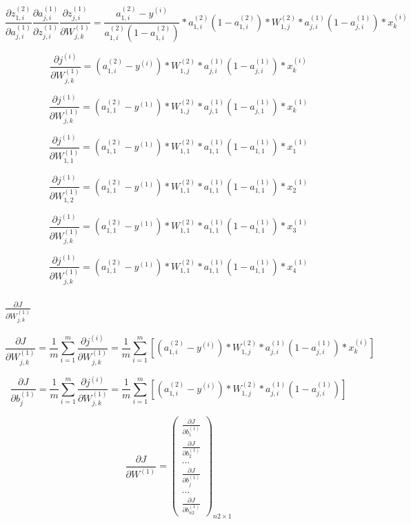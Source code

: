 \documentclass[
]{article}
\begin{document}
\[\frac{\partial{z^{(2)}_{1,i}}}{\partial{a^{(1)}_{j,i}}} \frac{\partial{a^{(1)}_{j,i}}}{\partial{z^{(1)}_{j,i}}} \frac{\partial{z^{(1)}_{j,i}}}{\partial{W^{(1)}_{j,k}}} = \frac{a^{(2)}_{1,i}-y^{(i)}}{a^{(2)}_{1,i}(1-a^{(2)}_{1,i})} * {a^{(2)}_{1,i}(1-a^{(2)}_{1,i})} * W^{(2)}_{1,j} * {a^{(1)}_{j,i}}(1-{a^{(1)}_{j,i}}) * x^{(i)}_{k}\]

\[\frac{\partial{j^{(i)}}}{\partial{W^{(1)}_{j,k}}} = (a^{(2)}_{1,i}-y^{(i)}) * W^{(2)}_{1,j} * {a^{(1)}_{j,i}}(1-{a^{(1)}_{j,i}}) * x^{(i)}_{k}\]

\[\frac{\partial{j^{(1)}}}{\partial{W^{(1)}_{j,k}}} = (a^{(2)}_{1,1}-y^{(1)}) * W^{(2)}_{1,j} * {a^{(1)}_{j,1}}(1-{a^{(1)}_{j,1}}) * x^{(1)}_{k}\]

\[\frac{\partial{j^{(1)}}}{\partial{W^{(1)}_{1,1}}} = (a^{(2)}_{1,1}-y^{(1)}) * W^{(2)}_{1,1} * {a^{(1)}_{1,1}}(1-{a^{(1)}_{1,1}}) * x^{(1)}_{1}\]

\[\frac{\partial{j^{(1)}}}{\partial{W^{(1)}_{1,2}}} = (a^{(2)}_{1,1}-y^{(1)}) * W^{(2)}_{1,1} * {a^{(1)}_{1,1}}(1-{a^{(1)}_{1,1}}) * x^{(1)}_{2}\]

\[\frac{\partial{j^{(1)}}}{\partial{W^{(1)}_{j,k}}} = (a^{(2)}_{1,1}-y^{(1)}) * W^{(2)}_{1,1} * {a^{(1)}_{1,1}}(1-{a^{(1)}_{1,1}}) * x^{(1)}_{3}\]

\[\frac{\partial{j^{(1)}}}{\partial{W^{(1)}_{j,k}}} = (a^{(2)}_{1,1}-y^{(1)}) * W^{(2)}_{1,1} * {a^{(1)}_{1,1}}(1-{a^{(1)}_{1,1}}) * x^{(1)}_{4}\]

\hypertarget{header-n88}{%
\subsubsection{\texorpdfstring{\(\frac{\partial J}{\partial W^{(1)}_{j,k}}\)}{\textbackslash frac\{\textbackslash partial J\}\{\textbackslash partial W\^{}\{(1)\}\_\{j,k\}\}}}\label{header-n88}}

\[\frac{\partial J}{\partial W^{(1)}_{j,k}} = \frac{1}{m}\sum_{i=1}^{m}\frac{\partial{j^{(i)}}}{\partial{W^{(1)}_{j,k}}} = \frac{1}{m}\sum_{i=1}^{m}[(a^{(2)}_{1,i}-y^{(i)}) * W^{(2)}_{1,j} * {a^{(1)}_{j,i}}(1-{a^{(1)}_{j,i}}) * x^{(i)}_{k}]\]

\[\frac{\partial J}{\partial b^{(1)}_{j}} = \frac{1}{m}\sum_{i=1}^{m}\frac{\partial{j^{(i)}}}{\partial{W^{(1)}_{j,k}}} = \frac{1}{m}\sum_{i=1}^{m}[(a^{(2)}_{1,i}-y^{(i)}) * W^{(2)}_{1,j} * {a^{(1)}_{j,i}}(1-{a^{(1)}_{j,i}})]\]

\[\frac{\partial J}{\partial W^{(1)}} = {
    \begin{pmatrix}
      \frac{\partial J}{\partial b^{(1)}_{1}} \\
      \frac{\partial J}{\partial b^{(1)}_{2}} \\
      ...\\
      \frac{\partial J}{\partial b^{(1)}_{j}} \\
      ...\\
      \frac{\partial J}{\partial b^{(1)}_{n2}}
    \end{pmatrix}
  }_{n2×1}\]
\end{document}
